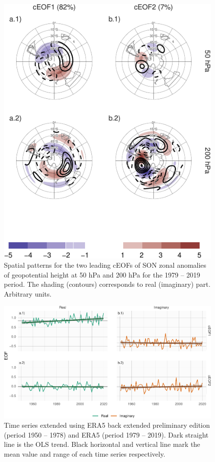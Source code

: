 \documentclass[smallextended]{svjour3}       %
\begin{document}
\begin{figure}
\centering
\includegraphics{../figures/ceofs-1-1.pdf}
\caption{\label{fig:ceofs-1}Spatial patterns for the two leading cEOFs of SON zonal anomalies of geopotential height at 50 hPa and 200 hPa for the 1979 -- 2019 period. The shading (contours) corresponds to real (imaginary) part. Arbitrary units.}
\end{figure}



\begin{figure}
\includegraphics{../figures/extended-series-1} \caption{Time series extended using ERA5 back extended preliminary edition (period 1950 -- 1978) and ERA5 (period 1979 -- 2019). Dark straight line is the OLS trend. Black horizontal and vertical line mark the mean value and range of each time series respectively.}\label{fig:extended-series}
\end{figure}
\end{document}
